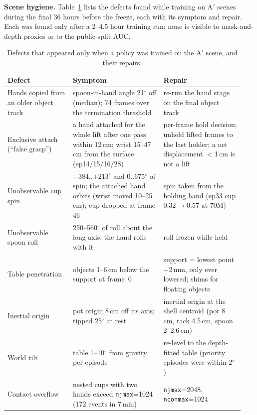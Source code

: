 \textbf{Scene hygiene.} Table~\ref{tab:hygiene} lists the defects found while training on A$'$
scenes during the final 36 hours before the freeze, each with its symptom and repair. Each was
found only after a 2--4.5 hour training run; none is visible to mask-and-depth proxies or to the
public-split AUC.
\begin{table}[ht]
  \centering\small
  \setlength{\tabcolsep}{3pt}
  \begin{tabular}{p{0.26\linewidth}p{0.36\linewidth}p{0.32\linewidth}}
    \toprule
    Defect & Symptom & Repair \\
    \midrule
    Hands copied from an older object track & spoon-in-hand angle 21$^\circ$ off (median); 74 frames over the termination threshold & re-run the hand stage on the final object track \\
    Exclusive attach (``false grasp'') & a hand attached for the whole lift after one pass within 12\,cm; wrist 15--47\,cm from the surface (ep14/15/16/28) & per-frame hold decision; unheld lifted frames to the last holder; a net displacement $<$1\,cm is not a lift \\
    Unobservable cup spin & $-384$..$+213^\circ$ and 0..675$^\circ$ of spin; the attached hand orbits (wrist moved 10--25\,cm); cup dropped at frame 46 & spin taken from the holding hand (ep33 cup 0.32$\rightarrow$0.57 at 70M) \\
    Unobservable spoon roll & 250--560$^\circ$ of roll about the long axis; the hand rolls with it & roll frozen while held \\
    Table penetration & objects 1--6\,cm below the support at frame~0 & support = lowest point $-$2\,mm, only ever lowered; shims for floating objects \\
    Inertial origin & pot origin 8\,cm off its axis; tipped 25$^\circ$ at rest & inertial origin at the shell centroid (pot 8\,cm, rack 4.5\,cm, spoon 2--2.6\,cm) \\
    World tilt & table 1--10$^\circ$ from gravity per episode & re-level to the depth-fitted table (priority episodes were within 2$^\circ$) \\
    Contact overflow & nested cups with two hands exceed \texttt{njmax}=1024 (172 events in 7\,min) & \texttt{njmax}=2048, \texttt{nconmax}=1024 \\
    \bottomrule
  \end{tabular}
  \caption{Defects that appeared only when a policy was trained on the A$'$ scene, and their repairs.}
  \label{tab:hygiene}
\end{table}

